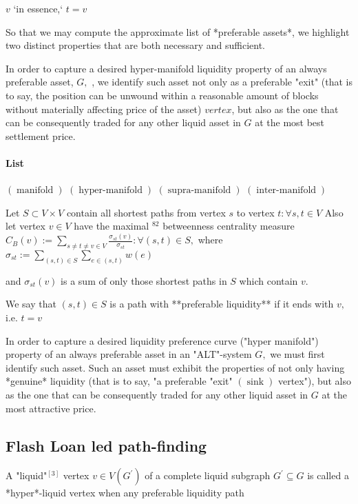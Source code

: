    $v$ `in essence,` $t=v$

So that we may compute the approximate list of *preferable assets*, we highlight two distinct properties that are both necessary and sufficient.

In order to capture a desired hyper-manifold liquidity property of an always preferable asset, $G,$ , we identify such asset not only as a preferable "exit" (that is to say, the position can be unwound within a reasonable amount of blocks without materially affecting price of the asset) $vertex$, but also as the one that can be consequently traded for any other liquid asset in $G$ at the most best settlement price.


\paragraph{List}

$(\operatorname{manifold})$
$(\operatorname{hyper-manifold})$
$(\operatorname{supra-manifold})$
$(\operatorname{inter-manifold})$


Let $S \subset V \times V$ contain all shortest paths from vertex $s$ to vertex $t: \forall s, t \in V$ Also let vertex $v \in V$ have the maximal $^{82}$ betweenness centrality measure $C_{B}(v):=\sum_{s \neq t \neq v \in V} \frac{\sigma_{s t}(v)}{\sigma_{s t}}: \forall(s, t) \in S,$ where $\sigma_{s t}:=\sum_{(s, t) \in S} \sum_{e \in(s, t)} w(e)$


and $\sigma_{s t}(v)$ is a sum of only those shortest paths in $S$ which contain $v .$

We say that $(s, t) \in S$ is a path with **preferable liquidity** if it ends with $v,$ i.e. $t=v$


In order to capture a desired liquidity preference curve ("hyper manifold") property of an always preferable asset in an 
"ALT"-system $G,$ we must first identify such asset. Such an asset must exhibit the properties of not only having *genuine* liquidity (that is to say, "a preferable "exit" $(\operatorname{sink})$ vertex"), but also as the one that can be consequently traded for any other liquid asset in $G$ at the most attractive price.

\subsection{Flash Loan led path-finding}

A "liquid"$^[3]$ vertex $v \in V\left(G^{\prime}\right)$ of a complete liquid subgraph $G^{\prime} \subseteq G$ is called a *hyper*-liquid vertex when any preferable liquidity path 

